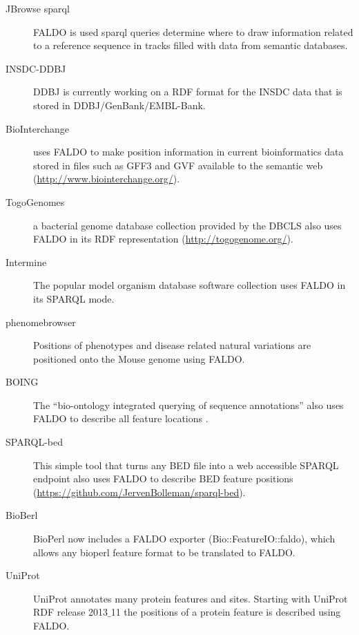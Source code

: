 \begin{description}
\item[JBrowse sparql] FALDO is used sparql queries determine where to draw information related to a reference sequence in tracks filled with data from semantic databases. 
\item[INSDC-DDBJ] DDBJ is currently working on a RDF format for the INSDC data that is stored in DDBJ/GenBank/EMBL-Bank.
\item[BioInterchange] uses FALDO to make position information in current bioinformatics data stored in files such as GFF3 and GVF available to the semantic web (\url{http://www.biointerchange.org/}).
\item[TogoGenomes] a bacterial genome database collection provided by the DBCLS also uses FALDO in its RDF representation (\url{http://togogenome.org/}).
\item[Intermine] The popular model organism database software collection uses FALDO in its SPARQL mode.
\item[phenomebrowser] Positions of phenotypes and disease related natural variations are positioned onto the Mouse genome using FALDO.
\item[BOING] The ``bio-ontology integrated querying of sequence annotations'' also uses FALDO to describe all feature locations \cite{BOING}.
\item[SPARQL-bed] This simple tool that turns any BED file into a web accessible SPARQL endpoint also uses FALDO to describe BED feature positions (\url{https://github.com/JervenBolleman/sparql-bed}).
\item[BioBerl] BioPerl\cite{BioPerl2002} now includes a FALDO exporter (Bio::FeatureIO::faldo), which allows any bioperl feature format to be translated to FALDO.
\item[UniProt] UniProt annotates many protein features and sites. Starting with UniProt RDF release 2013$\_$11 the positions of a protein feature is described using FALDO.
\end{description}


